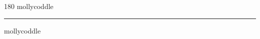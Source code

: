 
\begin{frame}
\begin{center}
\begin{turn}{180}
{\fontsize{2.5cm}{1em}\selectfont mollycoddle}
\end{turn}
\vspace{1em}\par  
\hrule
\vspace{1em}\par  
{\fontsize{2.5cm}{1em}\selectfont mollycoddle}
\end{center}
\end{frame}
